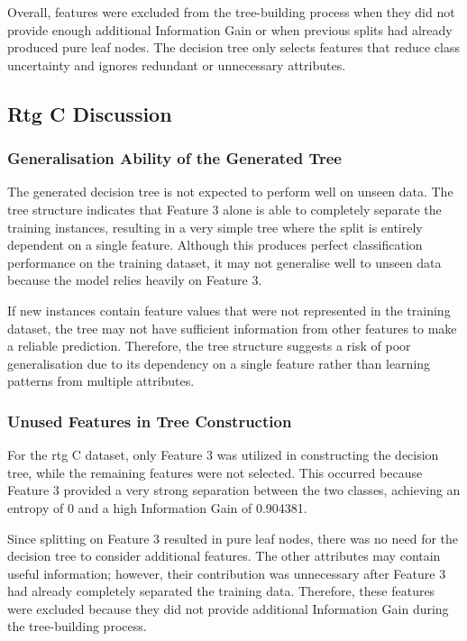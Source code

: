 \documentclass[conference,a4paper]{IEEEtran}
\begin{document}
Overall, features were excluded from the tree-building process when they did not
provide enough additional Information Gain or when previous splits had already
produced pure leaf nodes. The decision tree only selects features that reduce
class uncertainty and ignores redundant or unnecessary attributes.

\subsection{Rtg C Discussion}
\subsubsection{Generalisation Ability of the Generated Tree}

The generated decision tree is not expected to perform well on unseen data. The
tree structure indicates that Feature 3 alone is able to completely separate the
training instances, resulting in a very simple tree where the split is entirely
dependent on a single feature. Although this produces perfect classification
performance on the training dataset, it may not generalise well to unseen data
because the model relies heavily on Feature 3.

If new instances contain feature values that were not represented in the training
dataset, the tree may not have sufficient information from other features to make
a reliable prediction. Therefore, the tree structure suggests a risk of poor
generalisation due to its dependency on a single feature rather than learning
patterns from multiple attributes.


\subsubsection{Unused Features in Tree Construction}

For the rtg C dataset, only Feature 3 was utilized in constructing the decision
tree, while the remaining features were not selected. This occurred because
Feature 3 provided a very strong separation between the two classes, achieving an
entropy of 0 and a high Information Gain of 0.904381.

Since splitting on Feature 3 resulted in pure leaf nodes, there was no need for
the decision tree to consider additional features. The other attributes may
contain useful information; however, their contribution was unnecessary after
Feature 3 had already completely separated the training data. Therefore, these
features were excluded because they did not provide additional Information Gain
during the tree-building process.
\end{document}
